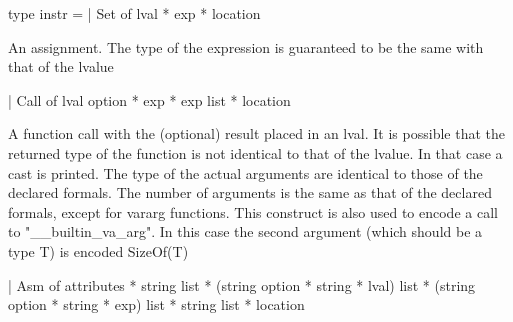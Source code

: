 \documentclass[11pt]{article}
\begin{document}
\label{type:Cil.instr}\begin{ocamldoccode}
type instr =
  | Set of lval * exp * location
\end{ocamldoccode}
\begin{ocamldoccomment}
An assignment. The type of the expression is guaranteed to be the same 
 with that of the lvalue
\end{ocamldoccomment}
\begin{ocamldoccode}
  | Call of lval option * exp * exp list * location
\end{ocamldoccode}
\begin{ocamldoccomment}
A function call with the (optional) result placed in an lval. It is 
 possible that the returned type of the function is not identical to 
 that of the lvalue. In that case a cast is printed. The type of the 
 actual arguments are identical to those of the declared formals. The 
 number of arguments is the same as that of the declared formals, except 
 for vararg functions. This construct is also used to encode a call to 
 "\_\_builtin\_va\_arg". In this case the second argument (which should be a 
 type T) is encoded SizeOf(T)
\end{ocamldoccomment}
\begin{ocamldoccode}
  | Asm of attributes * string list * (string option * string * lval) list
   * (string option * string * exp) list * string list * location
\end{ocamldoccode}
\end{document}
